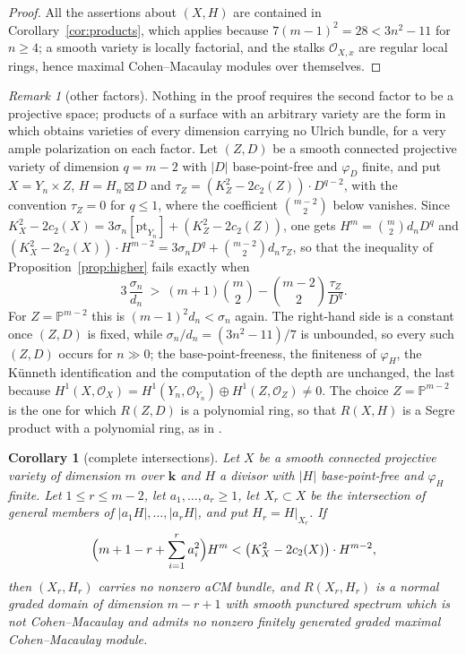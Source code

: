 \documentclass[11pt]{amsart}
\newtheorem{corollary}[theorem]{Corollary}
\theoremstyle{remark}
\newtheorem{remark}[theorem]{Remark}
\theoremstyle{definition}
\newcommand{\PP}{\mathbb{P}}
\newcommand{\bk}{\mathbf{k}}
\newcommand{\cO}{\mathcal{O}}
\begin{document}
\begin{proof}
All the assertions about $(X,H)$ are contained in Corollary~\ref{cor:products}, which applies because $7(m-1)^2=28<3n^2-11$ for $n\ge4$; a smooth variety is locally factorial, and the stalks $\cO_{X,x}$ are regular local rings, hence maximal Cohen--Macaulay modules over themselves.
\end{proof}

\begin{remark}[other factors]\label{rem:factors}
Nothing in the proof requires the second factor to be a projective space; products of a surface with an arbitrary variety are the form in which \cite[Thm.~1]{Lo} obtains varieties of every dimension carrying no Ulrich bundle, for a very ample polarization on each factor. Let $(Z,D)$ be a smooth connected projective variety of dimension $q=m-2$ with $|D|$ base-point-free and $\varphi_D$ finite, and put $X=Y_n\times Z$, $H=H_n\boxtimes D$ and $\tau_Z=(K_Z^2-2c_2(Z))\cdot D^{q-2}$, with the convention $\tau_Z=0$ for $q\le1$, where the coefficient $\binom{m-2}2$ below vanishes. Since $K_X^2-2c_2(X)=3\sigma_n[\mathrm{pt}_{Y_n}]+(K_Z^2-2c_2(Z))$, one gets $H^m=\binom m2d_nD^q$ and $(K_X^2-2c_2(X))\cdot H^{m-2}=3\sigma_nD^q+\binom{m-2}2d_n\tau_Z$, so that the inequality of Proposition~\ref{prop:higher} fails exactly when
\[
3\,\frac{\sigma_n}{d_n}\ >\ (m+1)\binom m2-\binom{m-2}2\frac{\tau_Z}{D^q} .
\]
For $Z=\PP^{m-2}$ this is $(m-1)^2d_n<\sigma_n$ again. The right-hand side is a constant once $(Z,D)$ is fixed, while $\sigma_n/d_n=(3n^2-11)/7$ is unbounded, so every such $(Z,D)$ occurs for $n\gg0$; the base-point-freeness, the finiteness of $\varphi_H$, the K\"unneth identification and the computation of the depth are unchanged, the last because $H^1(X,\cO_X)=H^1(Y_n,\cO_{Y_n})\oplus H^1(Z,\cO_Z)\ne0$. The choice $Z=\PP^{m-2}$ is the one for which $R(Z,D)$ is a polynomial ring, so that $R(X,H)$ is a Segre product with a polynomial ring, as in \cite{Ma19}.
\end{remark}

\begin{corollary}[complete intersections]\label{cor:ci}
Let $X$ be a smooth connected projective variety of dimension $m$ over $\bk$ and $H$ a divisor with $|H|$ base-point-free and $\varphi_H$ finite. Let $1\le r\le m-2$, let $a_1,\dots,a_r\ge1$, let $X_r\subset X$ be the intersection of general members of $|a_1H|,\dots,|a_rH|$, and put $H_r=H|_{X_r}$. If
\begin{equation}\label{eq:ci}
\Bigl(m+1-r+\sum_{i=1}^ra_i^2\Bigr)H^m<\bigl(K_X^2-2c_2(X)\bigr)\cdot H^{m-2},
\end{equation}
then $(X_r,H_r)$ carries no nonzero aCM bundle, and $R(X_r,H_r)$ is a normal graded domain of dimension $m-r+1$ with smooth punctured spectrum which is not Cohen--Macaulay and admits no nonzero finitely generated graded maximal Cohen--Macaulay module.
\end{corollary}
\end{document}
